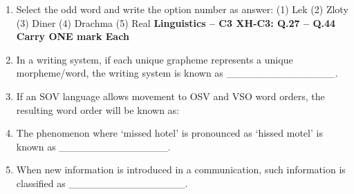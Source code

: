 \documentclass[12pt]{article}
\theoremstyle{remark}
\begin{document}
\begin{enumerate}
\hfill{}
\item Select the odd word and write the option number as answer: (1) Lek (2) Zloty (3) Diner (4) Drachma (5) Real
\hfill{}
\newpage
\textbf{Linguistics – C3\newline 
XH-C3: Q.27 – Q.44 Carry ONE mark Each}
\item In a writing system, if each unique grapheme represents a unique morpheme/word, the writing system is known as \_\_\_\_\_\_\_\_\_\_\_\_\_\_\_.
\begin{enumerate}  \end{enumerate}
\hfill{}
\item If an SOV language allows movement to OSV and VSO word orders, the resulting word order will be known as:
\begin{enumerate}  \end{enumerate}
\hfill{}
\item The phenomenon where ‘missed hotel’ is pronounced as ‘hissed motel’ is known as \_\_\_\_\_\_\_\_\_\_\_\_\_\_\_.
\begin{enumerate}  \end{enumerate}
\hfill{}
\item When new information is introduced in a communication, such information is classified as \_\_\_\_\_\_\_\_\_\_\_\_\_\_\_\_.
\begin{enumerate} \begin{multicols}{4}

\end{multicols}
\end{enumerate}
\end{enumerate}
\end{document}
